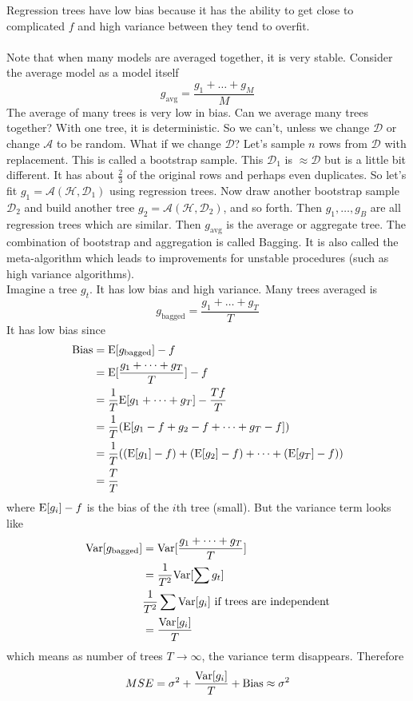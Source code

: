 \documentclass[12pt]{article}
\begin{document}
Regression trees have low bias because it has the ability to get close to complicated $f$ and high variance between they tend to overfit. \\~\\
Note that when many models are averaged together, it is very stable. Consider the average model as a model itself $$ g_{\text{avg}} = \frac{g_1 + \dots + g_M}{M} $$ The average of many trees is very low in bias. Can we average many trees together? With one tree, it is deterministic. So we can't, unless we change $\mathcal{D}$ or change $\mathcal{A}$ to be random. What if we change $\mathcal{D}$? Let's sample $n$ rows from $\mathcal{D}$ with replacement. This is called a bootstrap sample. This $\mathcal{D}_1$ is $\approx \mathcal{D}$ but is a little bit different. It has about $\frac{2}{3}$ of the original rows and perhaps even duplicates. So let's fit $g_1 = \mathcal{A}(\mathcal{H}, \mathcal{D}_{1})$ using regression trees. Now draw another bootstrap sample $\mathcal{D}_2$ and build another tree $g_2 = \mathcal{A}(\mathcal{H}, \mathcal{D}_2)$, and so forth. Then $g_1,\dots,g_B$ are all regression trees which are similar. Then $g_{\text{avg}}$ is the average or aggregate tree. The combination of bootstrap and aggregation is called Bagging. It is also called the meta-algorithm which leads to improvements for unstable procedures (such as high variance algorithms). \\ 
Imagine a tree $g_t$. It has low bias and high variance. Many trees averaged is $$g_{\text{bagged}} = \frac{g_1 + \dots + g_T}{T} $$ It has low bias since $$ \begin{aligned} \text{Bias} &= \mathrm{E}[ g_{\text{bagged}} ] - f \\ &= \mathrm{E}[ \frac{g_1 + \dots + g_T}{T} ] - f \\ &= \frac{1}{T} \mathrm{E}[ g_1 + \dots + g_T ] - \frac{Tf}{T} \\ &= \frac{1}{T}(\mathrm{E}[ g_1 - f + g_2 - f + \dots + g_T - f ]) \\ &= \frac{1}{T}((\mathrm{E}[ g_1 ] - f) + (\mathrm{E}[ g_2 ] - f) + \dots + (\mathrm{E}[ g_T ] - f)) \\ &= \frac{T}{T} \end{aligned} $$ where $\mathrm{E}[ g_i ] - f$ is the bias of the $i$th tree (small). But the variance term looks like $$ \begin{aligned} \mathrm{Var}[ g_{\text{bagged}} ] &= \mathrm{Var}[ \frac{g_1 + \dots + g_T}{T} ] \\ &= \frac{1}{T^2} \mathrm{Var}[ \sum g_t ] \\ &\frac{1}{T^2} \sum \mathrm{Var}[ g_i ] \text{ if trees are independent} \\ &= \frac{\mathrm{Var}[ g_i ]}{T} \end{aligned} $$ which means as number of trees $T \to \infty$, the variance term disappears. Therefore $$ MSE = \sigma^2 + \frac{\mathrm{Var}[ g_i ]}{T} + \text{Bias} \approx \sigma^2 $$ 
\end{document}
